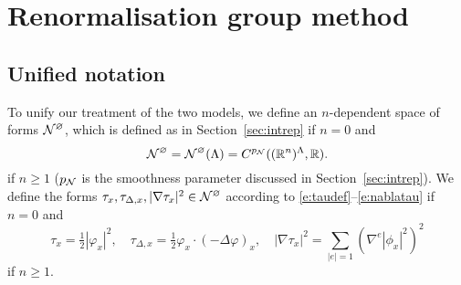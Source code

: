 \chapter{Renormalisation group method}




\section{Unified notation}

To unify our treatment of the two models, we define an $n$-dependent space of forms
$\mathcal{N}^\varnothing$, which is defined as in Section~\ref{sec:intrep} if $n = 0$ and
\begin{equation}
\label{e:Ncaldef}
\mathcal{N}^\varnothing
	= \mathcal{N}^\varnothing(\Lambda)
	= C^{p_{\mathcal{N}}}(({\mathbb R}^n)^\Lambda,{\mathbb R}).
\end{equation}
if $n \ge 1$ ($p_{\mathcal{N}}$ is the smoothness parameter discussed in Section~\ref{sec:intrep}).
We define the forms $\tau_x, \tau_{\Delta,x}, |\nabla\tau_x|^2 \in \mathcal{N}^\varnothing$ according
to \eqref{e:taudef}--\eqref{e:nablatau} if $n = 0$ and
\begin{equation}
\label{e:tauphi}
\tau_x = \tfrac{1}{2} |\varphi_x|^2,
	\quad
\tau_{\Delta,x} = \tfrac{1}{2} \varphi_x \cdot (-\Delta \varphi)_x,
	\quad
|\nabla\tau_x|^2 = \sum_{|e|=1} (\nabla^e |\phi_x|^2)^2
\end{equation}
if $n \ge 1$.

